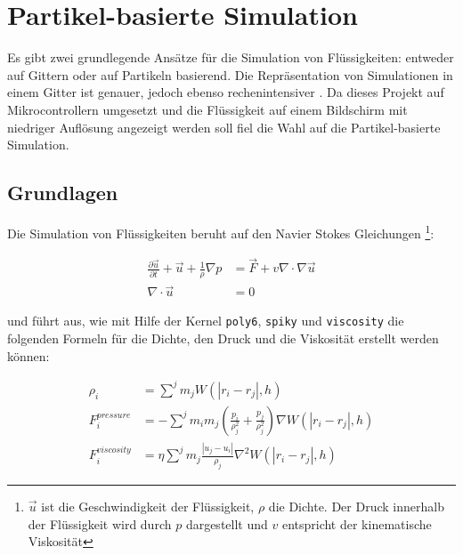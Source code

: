 
\section{Partikel-basierte Simulation}
Es gibt zwei grundlegende Ansätze für die Simulation von Flüssigkeiten: entweder auf Gittern oder auf Partikeln basierend. Die Repräsentation von Simulationen in einem Gitter ist genauer, jedoch ebenso rechenintensiver \cite{fluid.tutorial_paper}. Da dieses Projekt auf Mikrocontrollern umgesetzt und die Flüssigkeit auf einem Bildschirm mit niedriger Auflösung angezeigt werden soll fiel die Wahl auf die Partikel-basierte Simulation.

\subsection{Grundlagen}

Die Simulation von Flüssigkeiten beruht auf den Navier Stokes Gleichungen \cite{fluid.tutorial_paper}\footnote{$\overrightarrow{u}$ ist die Geschwindigkeit der Flüssigkeit, $\rho$ die Dichte. Der Druck innerhalb der Flüssigkeit wird durch $p$ dargestellt und $v$ entspricht der kinematische Viskosität}: 

\begin{align}
	\frac{\partial \overrightarrow{u}}{\partial t} + \overrightarrow{u} + \frac{1}{\rho} \nabla p &= \overrightarrow{F} + v \nabla \cdot \nabla \overrightarrow{u} \\
	\nabla \cdot \overrightarrow{u} &= 0
\end{align}

\cite{fluid.website} und \cite{fluid.website2} führt aus, wie mit Hilfe der Kernel \texttt{poly6}, \texttt{spiky} und \texttt{viscosity} die folgenden Formeln für die Dichte, den Druck und die Viskosität erstellt werden können:

\begin{align}
	\rho_i &= \sum^{j} m_j W(|r_i - r_j|, h) \\
	F_i^{pressure} &= - \sum^{j} m_i m_j (\frac{p_i}{\rho_j^2} + \frac{p_j}{\rho_j^2}) \nabla W(|r_i - r_j|, h) \\
	F_i^{viscosity} &= \eta \sum^{j} m_j \frac{|u_j - u_i|}{\rho_j} \nabla^2 W(|r_i - r_j|, h)
\end{align}

